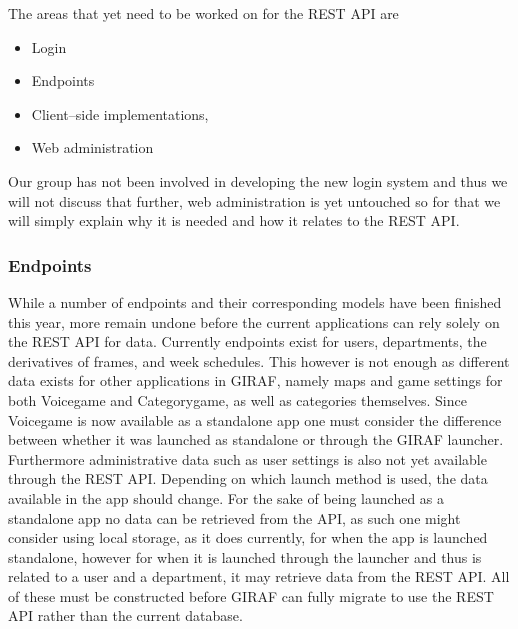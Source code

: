 The areas that yet need to be worked on for the REST API are
\begin{itemize}
\item Login
\item Endpoints
\item Client--side implementations,
\item Web administration
\end{itemize}
Our group has not been involved in developing the new login system and thus we will not discuss that further, web administration is yet untouched so for that we will simply explain why it is needed and how it relates to the REST API.


\subsubsection*{Endpoints}
While a number of endpoints and their corresponding models have been finished this year, more remain undone before the current applications can rely solely on the REST API for data.
Currently endpoints exist for users, departments, the derivatives of frames, and week schedules.
This however is not enough as different data exists for other applications in GIRAF, namely maps and game settings for both Voicegame and Categorygame, as well as categories themselves.
Since Voicegame is now available as a standalone app one must consider the difference between whether it was launched as standalone or through the GIRAF launcher.
Furthermore administrative data such as user settings is also not yet available through the REST API.
Depending on which launch method is used, the data available in the app should change.
For the sake of being launched as a standalone app no data can be retrieved from the API, as such one might consider using local storage, as it does currently, for when the app is launched standalone, however for when it is launched through the launcher and thus is related to a user and a department, it may retrieve data from the REST API.
All of these must be constructed before GIRAF can fully migrate to use the REST API rather than the current database.

